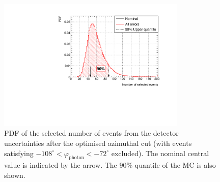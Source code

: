 \begin{figure}[ht]
  \begin{adjustbox}{center}
    \includegraphics[width=0.8\textwidth]{T2K-TN-254/images/systematics/QuantilePhi.pdf} 
  \end{adjustbox}
  \caption[PDF of the selected number of events from the detector
  uncertainties after the optimised azimuthal cut (with events
  satisfying $-108^{\circ} < \varphi_{\text{photon}} < -72^{\circ}$
  excluded)]{\Gls{PDF} of the selected number of events from the
    detector uncertainties after the optimised azimuthal cut (with
    events satisfying
    $-108^{\circ} < \varphi_{\text{photon}} < -72^{\circ}$ excluded).
    The nominal central value is indicated by the arrow. The $90\%$
    quantile of the \Gls{MC} is also shown.}
  \label{fig:allsystphi}
\end{figure}

